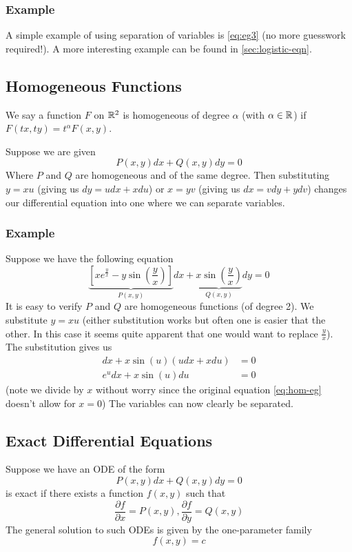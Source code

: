 \subsubsection{Example}
A simple example of using separation of variables is \autoref{eq:eg3} (no more guesswork required!). A more interesting example can be found in \autoref{sec:logistic-eqn}.

\subsection{Homogeneous Functions}
We say a function $F$ on $\mathbb{R}^2$ is homogeneous of degree $\alpha$ (with $\alpha \in \mathbb{R}$) if $F(tx, ty) = t^\alpha F(x, y)$.

Suppose we are given
\begin{equation}
    P(x, y) dx + Q(x, y) dy = 0
\end{equation}
Where $P$ and $Q$ are homogeneous and of the same degree. Then substituting $y = xu$ (giving us $dy = u dx + x du$) or $x = yv$ (giving us $dx = v dy + y dv$) changes our differential equation into one where we can separate variables.

\subsubsection{Example}
Suppose we have the following equation
\begin{equation}\label{eq:hom-eg}
    \underbrace{\left[ x e^{\frac{y}{x}} - y \sin \left(\frac{y}{x} \right) \right]}_{P(x, y)} dx + \underbrace{x \sin\left( \frac{y}{x} \right)}_{Q(x,y)} dy = 0
\end{equation}
It is easy to verify $P$ and $Q$ are homogeneous functions (of degree 2). We substitute $y = xu$ (either substitution works but often one is easier that the other. In this case it seems quite apparent that one would want to replace $\frac{y}{x}$). The substitution gives us
\begin{align*}
    [xe^u - xu \sin(u)] dx + x \sin(u)(u dx + x du) &= 0\\
    e^u dx + x \sin(u) du &= 0
\end{align*}
(note we divide by $x$ without worry since the original equation \autoref{eq:hom-eg} doesn't allow for $x = 0$)
The variables can now clearly be separated.

\subsection{Exact Differential Equations}\label{sec:exact-diff-eq}
Suppose we have an ODE of the form
$$ P(x, y)dx + Q(x, y)dy = 0 $$
is exact if there exists a function $f(x, y)$ such that
$$ \frac{\partial f}{\partial x} = P(x, y), \frac{\partial f}{\partial y} = Q(x, y) $$
The general solution to such ODEs is given by the one-parameter family
$$ f(x, y) = c $$

